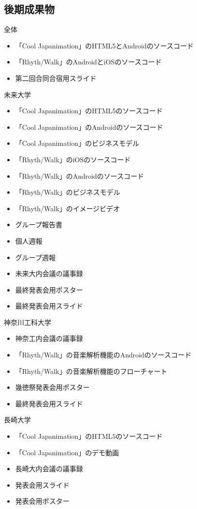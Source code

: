 \subsection{後期成果物}

全体
\begin{itemize}
\item 「Cool Japanimation」のHTML5とAndroidのソースコード
\item 「Rhyth/Walk」のAndroidとiOSのソースコード
\item 第二回合同合宿用スライド
\end{itemize}

未来大学
\begin{itemize}
\item 「Cool Japanimation」のHTML5のソースコード
\item 「Cool Japanimation」のAndroidのソースコード
\item 「Cool Japanimation」のビジネスモデル
\item 「Rhyth/Walk」のiOSのソースコード
\item 「Rhyth/Walk」のAndroidのソースコード
\item 「Rhyth/Walk」のビジネスモデル
\item 「Rhyth/Walk」のイメージビデオ
\item グループ報告書
\item 個人週報
\item グループ週報
\item 未来大内会議の議事録
\item 最終発表会用ポスター
\item 最終発表会用スライド
\end{itemize}

神奈川工科大学
\begin{itemize}
\item 神奈工内会議の議事録
\item 「Rhyth/Walk」の音楽解析機能のAndroidのソースコード
\item 「Rhyth/Walk」の音楽解析機能のフローチャート
\item 幾徳祭発表会用ポスター
\item 最終発表会用スライド
\end{itemize}

長崎大学
\begin{itemize}
\item 「Cool Japanimation」のHTML5のソースコード
\item 「Cool Japanimation」のデモ動画
\item 長崎大内会議の議事録
\item 発表会用スライド
\item 発表会用ポスター
\end{itemize}
